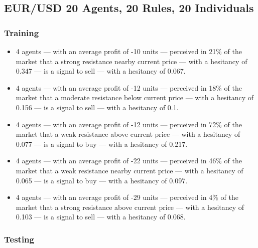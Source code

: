 \subsection{EUR/USD 20 Agents, 20 Rules, 20 Individuals}
\label{}

\subsubsection{Training}
\label{}

{\small
  \begin{itemize}
  \item 4 agents — with an average profit of -10 units — perceived in 21\% of
    the market that a strong resistance nearby current price — with a
    hesitancy of 0.347 — is a signal to sell — with a hesitancy of 0.067.
  \item 4 agents — with an average profit of -12 units — perceived in 18\% of the
    market that a moderate resistance below current price — with a hesitancy of
    0.156 — is a signal to sell — with a hesitancy of 0.1.
  \item 4 agents — with an average profit of -12 units — perceived in 72\% of the
    market that a weak resistance above current price — with a hesitancy of 0.077
    — is a signal to buy — with a hesitancy of 0.217.
  \item 4 agents — with an average profit of -22 units — perceived in 46\% of the
    market that a weak resistance nearby current price — with a hesitancy of 0.065
    — is a signal to buy — with a hesitancy of 0.097.
  \item 4 agents — with an average profit of -29 units — perceived in 4\% of the
    market that a strong resistance above current price — with a hesitancy of
    0.103 — is a signal to sell — with a hesitancy of 0.068.
  \end{itemize}
}

\subsubsection{Testing}
\label{}

